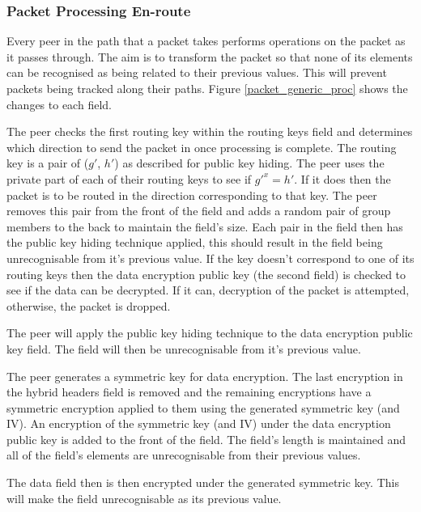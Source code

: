 \documentclass[ %
                    author={Luke Murray},
                supervisor={Dr. Simon Hollis},
                     title={Shadow Peer-to-Peer Networks},
                  subtitle={},
                    degree={MEng},
                      year={2013} ]{thesis}
\begin{document}
\subsubsection{Packet Processing En-route}

Every peer in the path that a packet takes performs operations on the packet as it passes through. The aim is to transform the packet so that none of its elements can be recognised as being related to their previous values. This will prevent packets being tracked along their paths. Figure \ref{packet_generic_proc} shows the changes to each field.

The peer checks the first routing key within the routing keys field and determines which direction to send the packet in once processing is complete. The routing key is a pair of ($g\prime$, $h\prime$) as described for public key hiding. The peer uses the private part of each of their routing keys to see if $g\prime^{x} = h\prime$. If it does then the packet is to be routed in the direction corresponding to that key. The peer removes this pair from the front of the field and adds a random pair of group members to the back to maintain the field's size. Each pair in the field then has the public key hiding technique applied, this should result in the field being unrecognisable from it's previous value. If the key doesn't correspond to one of its routing keys then the data encryption public key (the second field) is checked to see if the data can be decrypted. If it can, decryption of the packet is attempted, otherwise, the packet is dropped.

The peer will apply the public key hiding technique to the data encryption public key field. The field will then be unrecognisable from it's previous value.

The peer generates a symmetric key for data encryption. The last encryption in the hybrid headers field is removed and the remaining encryptions have a symmetric encryption applied to them using the generated symmetric key (and IV). An encryption of the symmetric key (and IV) under the data encryption public key is added to the front of the field. The field's length is maintained and all of the field's elements are unrecognisable from their previous values.

The data field then is then encrypted under the generated symmetric key. This will make the field unrecognisable as its previous value.
\end{document}
